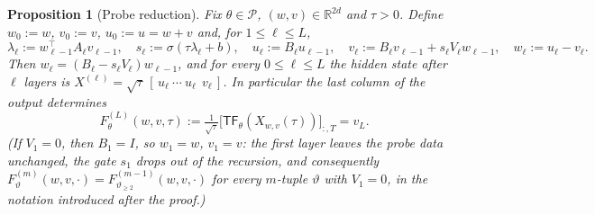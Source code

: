 \documentclass[11pt]{article}
\newtheorem{proposition}[theorem]{Proposition}
\theoremstyle{definition}
\theoremstyle{remark}
\theoremstyle{plain}
\newcommand{\R}{\mathbb{R}}
\newcommand{\cP}{\mathcal{P}}
\newcommand{\sig}{\sigma}
\newcommand{\TF}{\mathsf{TF}}
\begin{document}
\begin{proposition}[Probe reduction]\label{prop:probe}
Fix $\theta\in\cP$, $(w,v)\in\R^{2d}$ and $\tau>0$.  Define $w_0:=w$, $v_0:=v$,
$u_0:=u=w+v$ and, for $1\le\ell\le L$,
\begin{equation}\label{eq:recursion}
\lambda_\ell:=w_{\ell-1}^\top A_\ell v_{\ell-1},\quad
s_\ell:=\sig(\tau\lambda_\ell+b),\quad
u_\ell:=B_\ell u_{\ell-1},\quad
v_\ell:=B_\ell v_{\ell-1}+s_\ell V_\ell w_{\ell-1},\quad
w_\ell:=u_\ell-v_\ell .
\end{equation}
Then $w_\ell=(B_\ell-s_\ell V_\ell)w_{\ell-1}$, and for every $0\le\ell\le L$ the hidden
state after $\ell$ layers is
$X^{(\ell)}=\sqrt\tau\,[\,u_\ell\ \cdots\ u_\ell\ \ v_\ell\,]$.  In particular the last
column of the output determines
\begin{equation}\label{eq:F}
F^{(L)}_\theta(w,v,\tau):=\tfrac{1}{\sqrt\tau}\big[\TF_\theta(X_{w,v}(\tau))\big]_{:,T}=v_L .
\end{equation}
\textup{(}If $V_1=0$, then $B_1=I$, so $w_1=w$, $v_1=v$: the first layer leaves the probe
data unchanged, the gate $s_1$ drops out of the recursion, and consequently
$F^{(m)}_\vartheta(w,v,\cdot)=F^{(m-1)}_{\vartheta_{\ge2}}(w,v,\cdot)$ for every $m$-tuple
$\vartheta$ with $V_1=0$, in the notation introduced after the proof.\textup{)}
\end{proposition}
\end{document}
